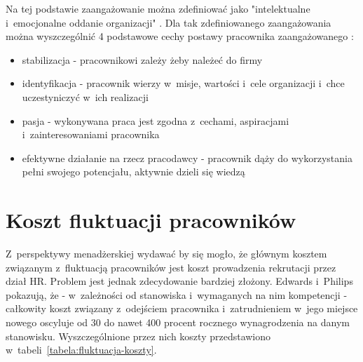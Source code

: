 Na tej podstawie zaangażowanie można zdefiniować jako "intelektualne i~emocjonalne oddanie organizacji" \cite{juchnowicz-2010}.
Dla tak zdefiniowanego zaangażowania można wyszczególnić 4 podstawowe cechy postawy pracownika zaangażowanego \cite{juchnowicz-2010}:
\begin{itemize}
    \item stabilizacja - pracownikowi zależy żeby należeć do firmy
    \item identyfikacja - pracownik wierzy w~misje, wartości i~cele organizacji i~chce uczestyniczyć w~ich realizacji
    \item pasja - wykonywana praca jest zgodna z~cechami, aspiracjami i~zainteresowaniami pracownika
    \item efektywne działanie na rzecz pracodawcy - pracownik dąży do wykorzystania pełni swojego potencjału, aktywnie dzieli się wiedzą
\end{itemize}



\section{Koszt fluktuacji pracowników}\label{sec:koszt-fluktuacji}

Z~perspektywy menadżerskiej wydawać by się mogło, że głównym kosztem związanym z~fluktuacją pracowników jest koszt prowadzenia rekrutacji przez dział HR.
Problem jest jednak zdecydowanie bardziej złożony.
Edwards i~Philips \cite{philips-edwards-2009} pokazują, że - w~zależności od stanowiska i~wymaganych na nim kompetencji -
całkowity koszt związany z~odejściem pracownika i~zatrudnieniem w~jego miejsce nowego oscyluje od 30 do nawet 400 procent
rocznego wynagrodzenia na danym stanowisku. Wyszczególnione przez nich koszty przedstawiono w~tabeli~\ref{tabela:fluktuacja-koszty}.

